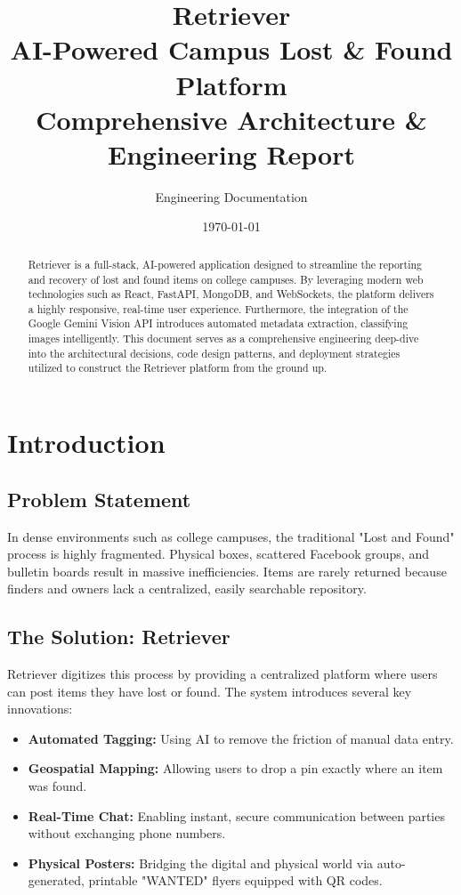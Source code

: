 \documentclass[12pt,a4paper]{report}
\title{
    \vspace{2in}
    \Huge\textbf{Retriever} \\
    \Large\vspace{0.5in}
    AI-Powered Campus Lost \& Found Platform \\
    \vspace{0.5in}
    \Large Comprehensive Architecture \& Engineering Report
    \vfill
}
\author{Engineering Documentation}
\date{\today}
\begin{document}
\maketitle
\tableofcontents
\newpage

\begin{abstract}
Retriever is a full-stack, AI-powered application designed to streamline the reporting and recovery of lost and found items on college campuses. By leveraging modern web technologies such as React, FastAPI, MongoDB, and WebSockets, the platform delivers a highly responsive, real-time user experience. Furthermore, the integration of the Google Gemini Vision API introduces automated metadata extraction, classifying images intelligently. This document serves as a comprehensive engineering deep-dive into the architectural decisions, code design patterns, and deployment strategies utilized to construct the Retriever platform from the ground up.
\end{abstract}

\chapter{Introduction}
\section{Problem Statement}
In dense environments such as college campuses, the traditional "Lost and Found" process is highly fragmented. Physical boxes, scattered Facebook groups, and bulletin boards result in massive inefficiencies. Items are rarely returned because finders and owners lack a centralized, easily searchable repository.

\section{The Solution: Retriever}
Retriever digitizes this process by providing a centralized platform where users can post items they have lost or found. The system introduces several key innovations:
\begin{itemize}
    \item \textbf{Automated Tagging:} Using AI to remove the friction of manual data entry.
    \item \textbf{Geospatial Mapping:} Allowing users to drop a pin exactly where an item was found.
    \item \textbf{Real-Time Chat:} Enabling instant, secure communication between parties without exchanging phone numbers.
    \item \textbf{Physical Posters:} Bridging the digital and physical world via auto-generated, printable "WANTED" flyers equipped with QR codes.
\end{itemize}
\end{document}
